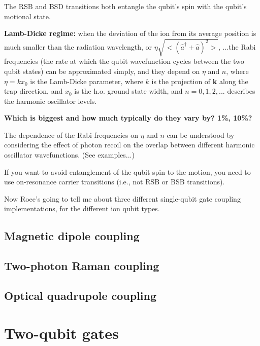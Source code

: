 \documentclass{article}
\begin{document}
The RSB and BSD transitions both entangle the qubit's spin with the qubit's motional state.

\textbf{Lamb-Dicke regime:} when the deviation of the ion from its average position is much smaller than the radiation wavelength, or $\eta \sqrt{< ( \hat{a}^{\dagger} + \hat{a} )^2 >}$, ...the Rabi frequencies (the rate at which the qubit wavefunction cycles between the two qubit states) can be approximated simply, and they depend on $\eta$ and $n$, where $\eta = k x_0$ is the Lamb-Dicke parameter, where $k$ is the projection of \textbf{k} along the trap direction, and $x_0$ is the h.o. ground state width, and $n = 0,1, 2, ...$ describes the harmonic oscillator levels. 

\textbf{Which is biggest and how much typically do they vary by? 1\%, 10\%?}

The dependence of the Rabi frequencies on $\eta$ and $n$ can be understood by considering the effect of photon recoil on the overlap between different harmonic oscillator wavefunctions. (See examples...)

If you want to avoid entanglement of the qubit spin to the motion, you need to use on-resonance carrier transitions (i.e., not RSB or BSB transitions).

Now Roee's going to tell me about three different single-qubit gate coupling implementations, for the different ion qubit types.


\subsection{Magnetic dipole coupling}


\subsection{Two-photon Raman coupling}


\subsection{Optical quadrupole coupling}




\section{Two-qubit gates}
\end{document}
